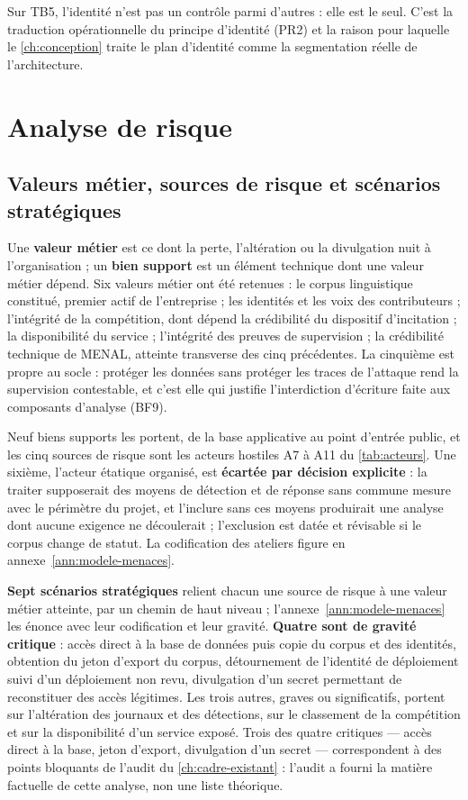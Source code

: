 \begin{keybox}
Sur TB5, l'identité n'est pas un contrôle parmi d'autres : elle est le seul. C'est la traduction
opérationnelle du principe d'identité (PR2) et la raison pour laquelle le \cref{ch:conception} traite le
plan d'identité comme la segmentation réelle de l'architecture.
\end{keybox}

\section{Analyse de risque}

\subsection{Valeurs métier, sources de risque et scénarios stratégiques}

Une \textbf{valeur métier} est ce dont la perte, l'altération ou la divulgation nuit à
l'organisation ; un \textbf{bien support} est un élément technique dont une valeur métier dépend.
Six valeurs métier ont été retenues : le corpus linguistique constitué, premier actif de
l'entreprise ; les identités et les voix des contributeurs ; l'intégrité de la compétition, dont
dépend la crédibilité du dispositif d'incitation ; la disponibilité du service ; l'intégrité des
preuves de supervision ; la crédibilité technique de MENAL, atteinte transverse des cinq
précédentes. La cinquième est propre au socle : protéger les données sans protéger les traces de
l'attaque rend la supervision contestable, et c'est elle qui justifie l'interdiction d'écriture
faite aux composants d'analyse (BF9).

Neuf biens supports les portent, de la base applicative au point d'entrée public, et les cinq
sources de risque sont les acteurs hostiles A7 à A11 du \cref{tab:acteurs}. Une sixième,
l'acteur étatique organisé, est \textbf{écartée par décision explicite} : la traiter supposerait
des moyens de détection et de réponse sans commune mesure avec le périmètre du projet, et l'inclure
sans ces moyens produirait une analyse dont aucune exigence ne découlerait ; l'exclusion est datée
et révisable si le corpus change de statut. La codification des ateliers figure en
annexe~\ref{ann:modele-menaces}.

\textbf{Sept scénarios stratégiques} relient chacun une source de risque à une valeur métier
atteinte, par un chemin de haut niveau ; l'annexe~\ref{ann:modele-menaces} les énonce avec leur
codification et leur gravité. \textbf{Quatre sont de gravité critique} : accès direct à la base de
données puis copie du corpus et des identités, obtention du jeton d'export du corpus, détournement
de l'identité de déploiement suivi d'un déploiement non revu, divulgation d'un secret permettant de
reconstituer des accès légitimes. Les trois autres, graves ou significatifs, portent sur
l'altération des journaux et des détections, sur le classement de la compétition et sur la
disponibilité d'un service exposé. Trois des quatre critiques --- accès direct à la base, jeton
d'export, divulgation d'un secret --- correspondent à des points bloquants de l'audit du
\cref{ch:cadre-existant} : l'audit a fourni la matière factuelle de cette analyse, non une liste théorique.

